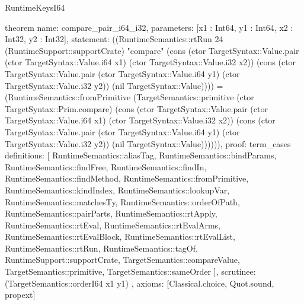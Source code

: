 \begin{lexlean}{RuntimeKeysI64}
\begin{semanticmodule}
theorem{
  name: compare_pair_i64_i32,
  parameters: [x1 : Int64, y1 : Int64, x2 : Int32, y2 : Int32],
  statement: ((RuntimeSemantics::rtRun 24 (RuntimeSupport::supportCrate) "compare" (cons (ctor TargetSyntax::Value.pair (ctor TargetSyntax::Value.i64 x1) (ctor TargetSyntax::Value.i32 x2)) (cons (ctor TargetSyntax::Value.pair (ctor TargetSyntax::Value.i64 y1) (ctor TargetSyntax::Value.i32 y2)) (nil TargetSyntax::Value)))) = (RuntimeSemantics::fromPrimitive (TargetSemantics::primitive (ctor TargetSyntax::Prim.compare) (cons (ctor TargetSyntax::Value.pair (ctor TargetSyntax::Value.i64 x1) (ctor TargetSyntax::Value.i32 x2)) (cons (ctor TargetSyntax::Value.pair (ctor TargetSyntax::Value.i64 y1) (ctor TargetSyntax::Value.i32 y2)) (nil TargetSyntax::Value)))))),
  proof: term_cases{
    definitions: [
      RuntimeSemantics::aliasTag,
      RuntimeSemantics::bindParams,
      RuntimeSemantics::findFree,
      RuntimeSemantics::findIn,
      RuntimeSemantics::findMethod,
      RuntimeSemantics::fromPrimitive,
      RuntimeSemantics::kindIndex,
      RuntimeSemantics::lookupVar,
      RuntimeSemantics::matchesTy,
      RuntimeSemantics::orderOfPath,
      RuntimeSemantics::pairParts,
      RuntimeSemantics::rtApply,
      RuntimeSemantics::rtEval,
      RuntimeSemantics::rtEvalArms,
      RuntimeSemantics::rtEvalBlock,
      RuntimeSemantics::rtEvalList,
      RuntimeSemantics::rtRun,
      RuntimeSemantics::tagOf,
      RuntimeSupport::supportCrate,
      TargetSemantics::compareValue,
      TargetSemantics::primitive,
      TargetSemantics::sameOrder
    ],
    scrutinee: (TargetSemantics::orderI64 x1 y1)
  },
  axioms: [Classical.choice, Quot.sound, propext]
}


\end{semanticmodule}
\end{lexlean}
